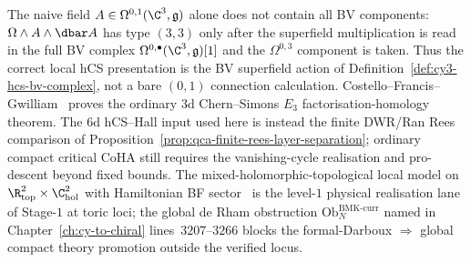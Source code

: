 \begin{remark}
\label{rem:6d-not-lagrangian}
The naive field $A\in\Omega^{0,1}(\C^3,\mathfrak g)$ alone does not contain all BV components: $\Omega\wedge A\wedge\dbar A$ has type $(3,3)$ only after the superfield multiplication is read in the full BV complex $\Omega^{0,\bullet}(\C^3,\mathfrak g)[1]$ and the $\Omega^{0,3}$ component is taken. Thus the correct local hCS presentation is the BV superfield action of Definition~\ref{def:cy3-hcs-bv-complex}, not a bare $(0,1)$ connection calculation. Costello--Francis--Gwilliam~\cite{CFG2026} proves the ordinary $3$d Chern--Simons $E_3$ factorisation-homology theorem. The $6$d hCS--Hall input used here is instead the finite DWR/Ran Rees comparison of Proposition~\ref{prop:qca-finite-rees-layer-separation}; ordinary compact critical CoHA still requires the vanishing-cycle realisation and pro-descent beyond fixed bounds. The mixed-holomorphic-topological local model on $\R^2_{\mathrm{top}} \times \C^2_{\mathrm{hol}}$ with Hamiltonian BF sector~\cite{LorgatMixedHTStrings} is the level-$1$ physical realisation lane of Stage-$1$ at toric loci; the global de Rham obstruction $\mathrm{Ob}^{\mathrm{BMK\text{-}curr}}_N$ named in~\cite{LorgatMixedHTStrings} Chapter~\ref{ch:cy-to-chiral} lines~$3207$--$3266$ blocks the formal-Darboux $\Rightarrow$ global compact theory promotion outside the verified locus.
\end{remark}

